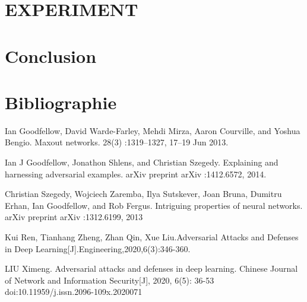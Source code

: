 \documentclass{article}
\begin{document}
\section{EXPERIMENT}
\label{sec:experimence}


\section{Conclusion}
\label{sec:conclusion}


\section{Bibliographie}


Ian Goodfellow, David Warde-Farley, Mehdi Mirza, Aaron Courville, and Yoshua Bengio. Maxout networks. 28(3) :1319–1327, 17–19 Jun 2013.

Ian J Goodfellow, Jonathon Shlens, and Christian Szegedy. Explaining and harnessing adversarial examples. arXiv preprint arXiv :1412.6572, 2014.

Christian Szegedy, Wojciech Zaremba, Ilya Sutskever, Joan Bruna, Dumitru Erhan, Ian Goodfellow, and Rob Fergus. Intriguing properties of neural networks. arXiv preprint arXiv :1312.6199, 2013

Kui Ren, Tianhang Zheng, Zhan Qin, Xue Liu.Adversarial Attacks and Defenses in Deep Learning[J].Engineering,2020,6(3):346-360.

LIU Ximeng. Adversarial attacks and defenses in deep learning. Chinese Journal of Network and Information Security[J], 2020, 6(5): 36-53 doi:10.11959/j.issn.2096-109x.2020071




\end{document}

